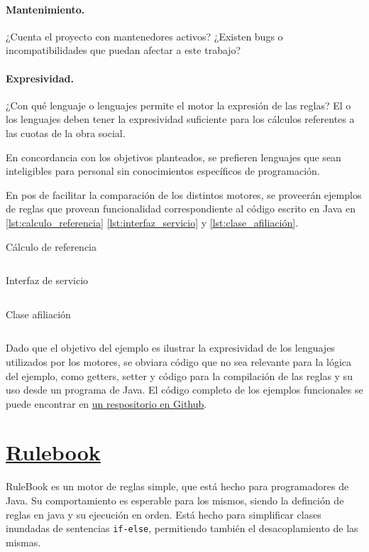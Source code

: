 \paragraph{Mantenimiento.}
¿Cuenta el proyecto con mantenedores activos? ¿Existen bugs o incompatibilidades que puedan afectar a este trabajo?

\paragraph{Expresividad.}
¿Con qué lenguaje o lenguajes permite el motor la expresión de las reglas? El o los lenguajes deben tener la expresividad suficiente para los cálculos referentes a las cuotas de la obra social.

En concordancia con los objetivos planteados, se prefieren lenguajes que sean inteligibles para personal sin conocimientos específicos de programación.

En pos de facilitar la comparación de los distintos motores, se proveerán ejemplos de reglas que provean funcionalidad correspondiente al código escrito en Java en \cref{lst:calculo_referencia} \cref{lst:interfaz_servicio} y \cref{lst:clase_afiliación}.

\begin{listing}[H]
	\caption{Cálculo de referencia}
	\label{lst:calculo_referencia}
	\inputminted{java}{code/CalculoReferencia.java}
\end{listing}

\begin{listing}[H]
	\caption{Interfaz de servicio}
	\label{lst:interfaz_servicio}
	\inputminted{java}{code/Servicio.java}
\end{listing}

\begin{listing}[H]
	\caption{Clase afiliación}
	\label{lst:clase_afiliación}
	\inputminted{java}{code/Afiliacion.java}
\end{listing}

Dado que el objetivo del ejemplo es ilustrar la expresividad de los lenguajes utilizados por los motores, se obviara código que no sea relevante para la lógica del ejemplo, como getters, setter y código para la compilación de las reglas y su uso desde un programa de Java.
El código completo de los ejemplos funcionales se puede encontrar en \href{https://github.com/IvanB101/ejemplos-motores-reglas}{un respositorio en Github}.

\section{\href{https://github.com/deliveredtechnologies/rulebook}{Rulebook}}
RuleBook es un motor de reglas simple, que está hecho para programadores de Java. Su comportamiento es esperable para los mismos, siendo la definción de reglas en java y su ejecución en orden. Está hecho para simplificar clases inundadas de sentencias \verb|if-else|, permitiendo también el desacoplamiento de las mismas.

